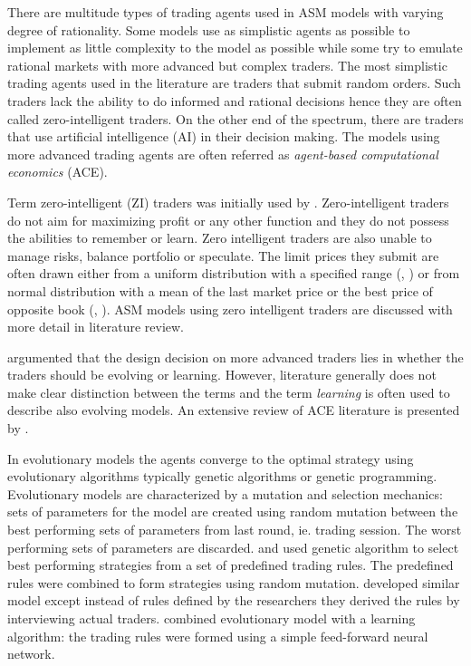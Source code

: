There are multitude types of trading agents used in ASM models with varying degree
of rationality. Some models use as simplistic agents as possible to implement as
little complexity to the model as possible while some try to emulate rational 
markets with more advanced but complex traders. The most simplistic trading agents
used in the literature are traders that submit random orders. Such traders
lack the ability to do informed and rational decisions hence they are often called
zero-intelligent traders. On the other end of the spectrum, there are traders
that use artificial intelligence (AI) in their decision making. The models using
more advanced trading agents are often referred as \emph{agent-based computational
economics} (ACE).

Term zero-intelligent (ZI) traders was initially used by \citet{God93}. Zero-intelligent
traders do not aim for maximizing profit or any other function and they do not 
possess the abilities to remember or learn. Zero intelligent traders are also unable
to manage risks, balance portfolio or speculate. The limit prices they submit are
often drawn either from a uniform distribution with a specified range (\citet{God93}, \citet{Mil08}) 
or from normal distribution with a mean of the last market price or the
best price of opposite book (\citet{LIU20082535}, \citet{Genoa01}). ASM models using
zero intelligent traders are discussed with more detail in literature review. 

\citet{LeBranon2000} argumented that the design decision on more advanced traders 
lies in whether the traders should be evolving or learning. However, literature
generally does not make clear distinction between the terms and the term \emph{learning}
is often used to describe also evolving models. An extensive review of ACE literature 
is presented by \citet{ACE12}.

In evolutionary models the agents converge to the optimal strategy using evolutionary algorithms typically
genetic algorithms or genetic programming. Evolutionary models are characterized by 
a mutation and selection mechanics: sets of parameters for the model are created 
using random mutation between the best performing sets of parameters from last 
round, ie. trading session. The worst performing sets of parameters are discarded.
\citet{GenAlgASM18} and \citet{GenAlgBTCASM19} used genetic algorithm to select 
best performing strategies from a set of predefined trading rules. The predefined
rules were combined to form strategies using random mutation. \citet{FieldGA05} developed
similar model except instead of rules defined by the researchers they derived the rules 
by interviewing actual traders. \citet{LeBranon2001} combined evolutionary model with a 
learning algorithm: the trading rules were formed using a simple feed-forward neural network.

